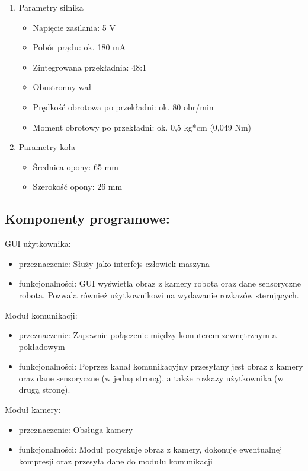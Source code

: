 \documentclass[a4paper]{article}
\begin{document}
\begin{enumerate}
\item Parametry silnika
\begin{itemize}
\item Napięcie zasilania: 5 V
\item Pobór prądu: ok. 180 mA
\item Zintegrowana przekładnia: 48:1
\item Obustronny wał
\item Prędkość obrotowa po przekładni: ok. 80 obr/min
\item Moment obrotowy po przekładni: ok. 0,5 kg*cm (0,049 Nm)
\end{itemize}

\item Parametry koła
\begin{itemize}
\item Średnica opony: 65 mm
\item Szerokość opony: 26 mm
\end{itemize}
\end{enumerate}

\subsection{Komponenty programowe:}
GUI użytkownika:
\begin{itemize}
\item przeznaczenie: Służy jako interfejs człowiek-maszyna
\item funkcjonalności: GUI wyświetla obraz z kamery robota oraz dane sensoryczne robota. Pozwala również użytkownikowi na wydawanie rozkazów sterujących. 
\end{itemize}

Moduł komunikacji:
\begin{itemize}
\item przeznaczenie: Zapewnie połączenie między komuterem zewnętrznym a pokładowym
\item funkcjonalności: Poprzez kanał komunikacyjny przesyłany jest obraz z kamery oraz dane sensoryczne (w jedną stroną), a także rozkazy użytkownika (w drugą stronę). 
\end{itemize}

Moduł kamery:
\begin{itemize}
\item przeznaczenie: Obsługa kamery
\item funkcjonalności: Moduł pozyskuje obraz z kamery, dokonuje ewentualnej kompresji oraz przesyła dane do modułu komunikacji
\end{itemize}
\end{document}
